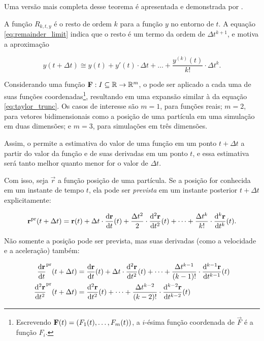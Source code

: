 Uma versão mais completa desse teorema é apresentada e demonstrada por .

A função \(R_{k, t, y}\) é o resto de ordem \(k\) para a função \(y\) no entorno de \(t\). A equação \eqref{eq:remainder_limit} indica que o resto é um termo da ordem de \(\Delta t^{k+1}\), e motiva a aproximação

\begin{equation} \label{eq:taylor_trunc}
    y(t + \Delta t) \cong y(t) + y'(t)\cdot\Delta t + \dots + \dfrac{y^{(k)}(t)}{k!}\cdot\Delta t^k.
\end{equation}

Considerando uma função \(\mathbf{F}:I\subseteq \mathbb{R} \rightarrow \mathbb{R}^m\), o  pode ser aplicado a cada uma de suas funções coordenadas\footnote{Escrevendo \(\vec{F}(t) = \pqty{F_1(t),\dots,F_m(t)}\), a \(i\)-ésima função coordenada de \(\vec{F}\) é a função \(F_i\).}, resultando em uma expansão similar à da equação \eqref{eq:taylor_trunc}. Os casos de interesse são \(m=1\), para funções reais; \(m=2\), para vetores bidimensionais como a posição de uma partícula em uma simulação em duas dimensões; e \(m=3\), para simulações em três dimensões.

Assim, o  permite a estimativa do valor de uma função em um ponto \(t+\Delta t\) a partir do valor da função e de suas derivadas em um ponto \(t\), e essa estimativa será tanto melhor quanto menor for o valor de \(\Delta t\).

Com isso, seja \(\vec{r}\) a função posição de uma partícula. Se a posição for conhecida em um instante de tempo \(t\), ela pode ser \textit{prevista} em um instante posterior \(t+\Delta t\) explicitamente:

\begin{equation} \label{eq:position_prediction}
	\predicted{\vec{r}}\pqty{t+\Delta t} = \vec{r}\pqty{t} + \Delta t\cdot\dv{\vec{r}}{t}\pqty{t} + \dfrac{\Delta t^2}{2}\cdot \dv[2]{\vec{r}}{t}\pqty{t} + \dots + \dfrac{\Delta t^k}{k!}\cdot \dv[k]{\vec{r}}{t}\pqty{t}.
\end{equation}

Não somente a posição pode ser prevista, mas suas derivadas (como a velocidade e a aceleração) também:

\begin{align}
	\predicted{\dv{\vec{r}}{t}}\pqty{t+\Delta t} & = \dv{\vec{r}}{t}\pqty{t} + \Delta t\cdot\dv[2]{\vec{r}}{t}\pqty{t} + \dots + \dfrac{\Delta t^{k-1}}{(k-1)!}\cdot \dv[k-1]{\vec{r}}{t}\pqty{t} 
    \\
	\predicted{\dv[2]{\vec{r}}{t}}\pqty{t+\Delta t} & = \dv[2]{\vec{r}}{t}\pqty{t} + \dots + \dfrac{\Delta t^{k-2}}{(k-2)!}\cdot \dv[k-2]{\vec{r}}{t}\pqty{t} 
\end{align}

